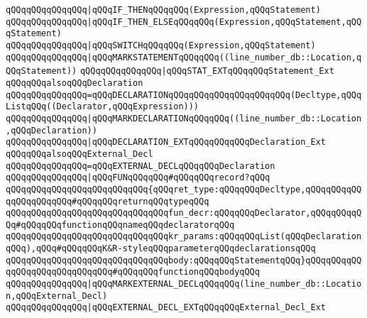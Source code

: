 \verb|qQQqqQQqqQQqqQQq|\verb#|qQQqIF_THENqQQqqQQq(Expression,qQQqStatement)#\newline
\verb|qQQqqQQqqQQqqQQq|\verb#|qQQqIF_THEN_ELSEqQQqqQQq(Expression,qQQqStatement,qQQqStatement)#\newline
\verb|qQQqqQQqqQQqqQQq|\verb#|qQQqSWITCHqQQqqQQq(Expression,qQQqStatement)#\newline
\verb|qQQqqQQqqQQqqQQq|\verb#|qQQqMARKSTATEMENTqQQqqQQq((line_number_db::Location,qQQqStatement))#\newline
\verb|qQQqqQQqqQQqqQQq|\verb#|qQQqSTAT_EXTqQQqqQQqStatement_Ext#\newline
\newline
\verb|qQQqqQQqalsoqQQqDeclaration|\newline
\verb|qQQqqQQqqQQqqQQq=qQQqDECLARATIONqQQqqQQqqQQqqQQqqQQqqQQq(Decltype,qQQqListqQQq((Declarator,qQQqExpression)))|\newline
\verb|qQQqqQQqqQQqqQQq|\verb#|qQQqMARKDECLARATIONqQQqqQQq((line_number_db::Location,qQQqDeclaration))#\newline
\verb|qQQqqQQqqQQqqQQq|\verb#|qQQqDECLARATION_EXTqQQqqQQqqQQqDeclaration_Ext#\newline
\newline
\verb|qQQqqQQqalsoqQQqExternal_Decl|\newline
\verb|qQQqqQQqqQQqqQQq=qQQqEXTERNAL_DECLqQQqqQQqDeclaration|\newline
\verb|qQQqqQQqqQQqqQQq|\verb#|qQQqFUNqQQqqQQq#\verb|#qQQqqQQqrecord?qQQq|\newline
\verb|qQQqqQQqqQQqqQQqqQQqqQQqqQQq{qQQqret_type:qQQqqQQqDecltype,qQQqqQQqqQQqqQQqqQQqqQQq#qQQqqQQqreturnqQQqtypeqQQq|\newline
\verb|qQQqqQQqqQQqqQQqqQQqqQQqqQQqqQQqfun_decr:qQQqqQQqDeclarator,qQQqqQQqqQQq#qQQqqQQqfunctionqQQqnameqQQqdeclaratorqQQq|\newline
\verb|qQQqqQQqqQQqqQQqqQQqqQQqqQQqqQQqkr_params:qQQqqQQqList(qQQqDeclarationqQQq),qQQq#qQQqqQQqK&R-styleqQQqparameterqQQqdeclarationsqQQq|\newline
\verb|qQQqqQQqqQQqqQQqqQQqqQQqqQQqqQQqbody:qQQqqQQqStatementqQQq}qQQqqQQqqQQqqQQqqQQqqQQqqQQqqQQq#qQQqqQQqfunctionqQQqbodyqQQq|\newline
\verb|qQQqqQQqqQQqqQQq|\verb#|qQQqMARKEXTERNAL_DECLqQQqqQQq(line_number_db::Location,qQQqExternal_Decl)#\newline
\verb|qQQqqQQqqQQqqQQq|\verb#|qQQqEXTERNAL_DECL_EXTqQQqqQQqExternal_Decl_Ext#\newline
\newline
